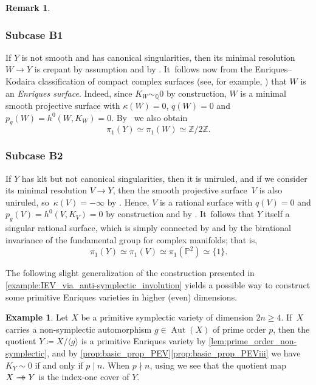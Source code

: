 \documentclass[JEP,XML,SOM,Unicode,published]{cedram}
\newcommand{\onto}{\mathchoice{\to\hspace*{-5mm}\to}{\mathrel{\hbox{$\to\hspace*{-2.85mm}\to$}}}{\to\hspace*{-3mm}\to}{\to\hspace*{-3mm}\to}}
\theoremstyle{plain}
\theoremstyle{definition}
\newtheorem{exa}[thm]{Example}
\newtheorem{rem}[thm]{Remark}
\newcommand{\Z}{\mathbb{Z}}
\newcommand{\Q}{\mathbb{Q}}
\DeclareMathOperator{\Aut}{Aut}
\begin{document}
\begin{rem}
\subsubsection*{Subcase B1}
If $Y$ is not smooth and has canonical singularities, then its minimal resolution $W \to Y$ is crepant by assumption and by \cite[Th.\,4-6-2]{Mat02}. It~follows now from the Enriques--Kodaira classification of compact complex surfaces (see, for example, \cite[Th.\,1-7-1]{Mat02}) that $W$ is an \emph{Enriques surface}. Indeed, since $K_W \sim_\Q 0$ by construction, $W$ is a minimal smooth projective surface with $\kappa(W) = 0$, $q(W) = 0$ and $p_g(W) = h^0(W,K_W) = 0$. By~\cite[Th.\,1.1]{Tak03} we also obtain
\[
\pi_1(Y) \simeq \pi_1(W) \simeq \Z / 2\Z.
\]

\subsubsection*{Subcase B2}
If $Y$ has klt but not canonical singularities, then it is uniruled, and if we consider its minimal resolution $V \to Y$, then the smooth projective surface~$V$ is also uniruled, so~$\kappa(V) = - \infty$ by \cite[Cor.\,4.12]{Debarre01book}. Hence, $V$ is a rational surface with $q(V) \!=\! 0$ and $p_g(V) \!=\! h^0(V,K_V) \!=\! 0$ by construction and by \cite[Th.\,\hbox{4-6-2}]{Mat02}. It~follows that $Y$ itself a singular rational surface, which is simply connected by \cite[Th.\,1.1]{Tak03} and by the birational invariance of the fundamental group for complex manifolds; that is,
\[
\pi_1(Y) \simeq \pi_1(V) \simeq \pi_1(\mathbb{P}^2) \simeq \{ 1 \}.
\]
\end{rem}

The following slight generalization of the construction presented in \autoref{example:IEV_via_anti-symplectic_involution} yields a possible way to construct some primitive Enriques varieties in higher (even) dimensions.


\begin{exa}
\label{example:PEV_via_prime_order_non-symplectic}
Let $X$ be a primitive symplectic variety of dimension $2n \geq 4$. If~$X$ carries a non-symplectic automorphism $g \in \Aut(X)$ of prime order $p$, then the quotient $Y \coloneqq X/ \langle g \rangle$ is a primitive Enriques variety by \autoref{lem:prime_order_non-symplectic}, and by \autoref{prop:basic_prop_PEV}\eqref{prop:basic_prop_PEViii} we have $K_Y \sim 0$ if and only if $p \mid n$. When $p \nmid n$, using \cite[Prop.\,5.20(1)]{KM98} we see that the quotient map $X \onto Y$ is the index-one cover of $Y$.
\end{exa}
\end{document}
